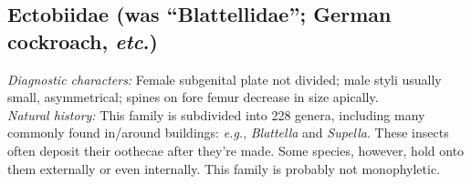 \documentclass[letterpaper, 11pt]{article}
\begin{document}
\subsection{Ectobiidae (was ``Blattellidae''; German cockroach, \textit{etc}.)}
\noindent{}\textit{Diagnostic characters:} Female subgenital plate not divided; male styli usually small, asymmetrical; spines on fore femur decrease in size apically. \\

\noindent{}\textit{Natural history:} This family is subdivided into 228 genera, including many commonly found in/around buildings: \textit{e.g.}, \textit{Blattella} and \textit{Supella}. These insects often deposit their oothecae after they're made. Some species, however, hold onto them externally or even internally. This family is probably not monophyletic. \\
\end{document}
